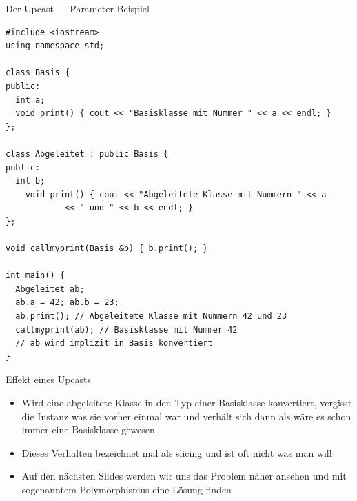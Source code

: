 \documentclass[presentation]{beamer}
\begin{document}
\begin{frame}[label={sec:org8f85a01},fragile]{Der Upcast --- Parameter Beispiel}
 \begin{verbatim}
#include <iostream>
using namespace std;

class Basis {
public:
  int a;
  void print() { cout << "Basisklasse mit Nummer " << a << endl; }
};

class Abgeleitet : public Basis {
public:
  int b;
    void print() { cout << "Abgeleitete Klasse mit Nummern " << a
			<< " und " << b << endl; }
};

void callmyprint(Basis &b) { b.print(); }

int main() {
  Abgeleitet ab;
  ab.a = 42; ab.b = 23;
  ab.print(); // Abgeleitete Klasse mit Nummern 42 und 23
  callmyprint(ab); // Basisklasse mit Nummer 42
  // ab wird implizit in Basis konvertiert
}
\end{verbatim}
\end{frame}
\begin{frame}[label={sec:org293e6b1}]{Effekt eines Upcasts}
\begin{itemize}
\item Wird eine abgeleitete Klasse in den Typ einer Basisklasse
konvertiert, vergisst die Instanz was sie vorher einmal war und
verhält sich dann als wäre es schon immer eine Basisklasse gewesen
\item Dieses Verhalten bezeichnet mal als \alert{slicing} und ist oft nicht was
man will
\item Auf den nächsten Slides werden wir uns das Problem näher ansehen und
mit sogenanntem \alert{Polymorphismus} eine Lösung finden
\end{itemize}
\end{frame}
\end{document}
